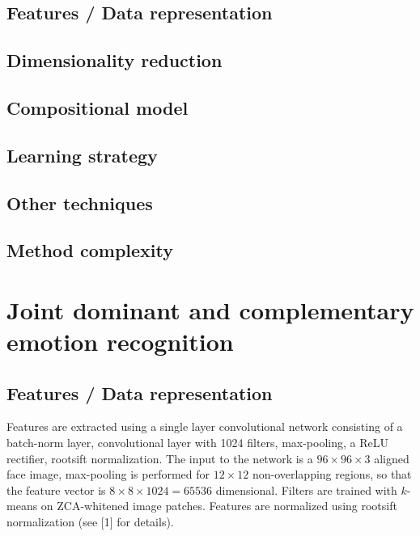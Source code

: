 \documentclass{article}
\begin{document}
\subsection{Features / Data representation}

\subsection{Dimensionality reduction}

\subsection{Compositional model}

\subsection{Learning strategy}

\subsection{Other techniques}

\subsection{Method complexity}


\section{Joint dominant and complementary emotion recognition}
\subsection{Features / Data representation}
Features are extracted using a single layer convolutional network consisting of a batch-norm layer, convolutional layer with 1024 filters, max-pooling, a ReLU rectifier, rootsift normalization. 
The input to the network is a $96\times96\times3$ aligned face image, max-pooling is performed for $12\times12$ non-overlapping regions, so that the feature vector is $8\times8\times1024=65536$ dimensional.
Filters are trained with $k$-means on ZCA-whitened image patches. Features are normalized using rootsift normalization (see [1] for details).
\end{document}
